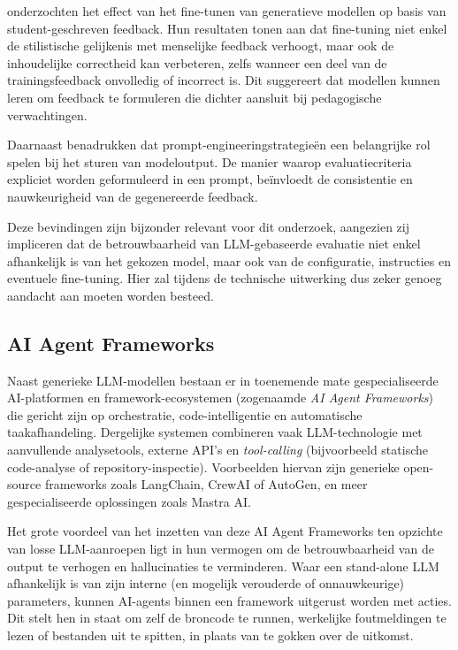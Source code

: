 \vspace{1em}

\textcite{Adurean2025} onderzochten het effect van het fine-tunen van generatieve modellen op basis van student-geschreven feedback. Hun resultaten tonen aan dat fine-tuning niet enkel de stilistische gelijkenis met menselijke feedback verhoogt, maar ook de inhoudelijke correctheid kan verbeteren, zelfs wanneer een deel van de trainingsfeedback onvolledig of incorrect is. Dit suggereert dat modellen kunnen leren om feedback te formuleren die dichter aansluit bij pedagogische verwachtingen.

\vspace{1em}

Daarnaast benadrukken \textcite{Koutcheme2025} dat prompt-engineeringstrategieën een belangrijke rol spelen bij het sturen van modeloutput. De manier waarop evaluatiecriteria expliciet worden geformuleerd in een prompt, beïnvloedt de consistentie en nauwkeurigheid van de gegenereerde feedback.

\vspace{1em}

Deze bevindingen zijn bijzonder relevant voor dit onderzoek, aangezien zij impliceren dat de betrouwbaarheid van LLM-gebaseerde evaluatie niet enkel afhankelijk is van het gekozen model, maar ook van de configuratie, instructies en eventuele fine-tuning. Hier zal tijdens de technische uitwerking dus zeker genoeg aandacht aan moeten worden besteed.

\subsection{AI Agent Frameworks}

Naast generieke LLM-modellen bestaan er in toenemende mate gespecialiseerde AI-platformen en framework-ecosystemen (zogenaamde \textit{AI Agent Frameworks}) die gericht zijn op orchestratie, code-intelligentie en automatische taakafhandeling. Dergelijke systemen combineren vaak LLM-technologie met aanvullende analysetools, externe API's en \textit{tool-calling} (bijvoorbeeld statische code-analyse of repository-inspectie). Voorbeelden hiervan zijn generieke open-source frameworks zoals LangChain, CrewAI of AutoGen, en meer gespecialiseerde oplossingen zoals Mastra AI.

\vspace{1em}

Het grote voordeel van het inzetten van deze AI Agent Frameworks ten opzichte van losse LLM-aanroepen ligt in hun vermogen om de betrouwbaarheid van de output te verhogen en hallucinaties te verminderen. Waar een stand-alone LLM afhankelijk is van zijn interne (en mogelijk verouderde of onnauwkeurige) parameters, kunnen AI-agents binnen een framework uitgerust worden met acties. Dit stelt hen in staat om zelf de broncode te runnen, werkelijke foutmeldingen te lezen of bestanden uit te spitten, in plaats van te gokken over de uitkomst. 

